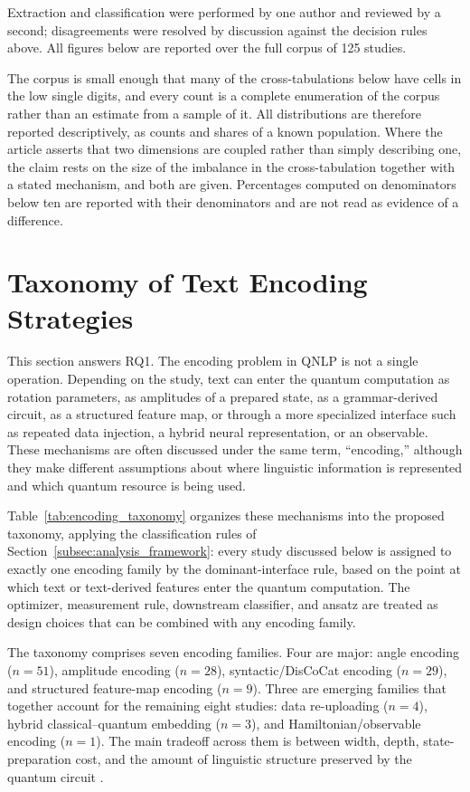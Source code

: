 \documentclass{ieeeaccess}
\begin{document}
Extraction and classification were performed by one author and reviewed by a second; disagreements were resolved by discussion against the decision rules above. All figures below are reported over the full corpus of 125 studies.

The corpus is small enough that many of the cross-tabulations below have cells in the low single digits, and every count is a complete enumeration of the corpus rather than an estimate from a sample of it. All distributions are therefore reported descriptively, as counts and shares of a known population. Where the article asserts that two dimensions are coupled rather than simply describing one, the claim rests on the size of the imbalance in the cross-tabulation together with a stated mechanism, and both are given. Percentages computed on denominators below ten are reported with their denominators and are not read as evidence of a difference.

\section{Taxonomy of Text Encoding Strategies}
\label{sec:taxonomy}

This section answers RQ1. The encoding problem in QNLP is not a single operation. Depending on the study, text can enter the quantum computation as rotation parameters, as amplitudes of a prepared state, as a grammar-derived circuit, as a structured feature map, or through a more specialized interface such as repeated data injection, a hybrid neural representation, or an observable. These mechanisms are often discussed under the same term, ``encoding,'' although they make different assumptions about where linguistic information is represented and which quantum resource is being used.

Table~\ref{tab:encoding_taxonomy} organizes these mechanisms into the proposed taxonomy, applying the classification rules of Section~\ref{subsec:analysis_framework}: every study discussed below is assigned to exactly one encoding family by the dominant-interface rule, based on the point at which text or text-derived features enter the quantum computation. The optimizer, measurement rule, downstream classifier, and ansatz are treated as design choices that can be combined with any encoding family.

The taxonomy comprises seven encoding families. Four are major: angle encoding ($n=51$), amplitude encoding ($n=28$), syntactic/DisCoCat encoding ($n=29$), and structured feature-map encoding ($n=9$). Three are emerging families that together account for the remaining eight studies: data re-uploading ($n=4$), hybrid classical--quantum embedding ($n=3$), and Hamiltonian/observable encoding ($n=1$). The main tradeoff across them is between width, depth, state-preparation cost, and the amount of linguistic structure preserved by the quantum circuit \cite{preskill2018quantum,cerezo2021variational,ruskanda_evaluating_2025}.
\end{document}
